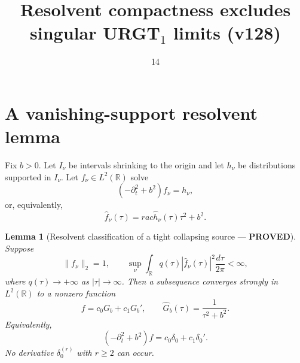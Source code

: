 \documentclass[11pt]{article}
\title{Resolvent compactness excludes singular URGT$_1$ limits (v128)}
\date{14}
\newcommand{\PROVED}{\textcolor{green!40!black}{\textbf{PROVED}}}
\newtheorem{lemma}{Lemma}
\begin{document}
\maketitle

\section{A vanishing-support resolvent lemma}

Fix $b>0$.  Let $I_\nu$ be intervals shrinking to the origin and let
$h_\nu$ be distributions supported in $I_\nu$.  Let $f_\nu\in L^2(\mathbb
R)$ solve
\begin{equation}
 (-\partial_t^2+b^2)f_\nu=h_\nu,                            \tag{1}
\end{equation}
or, equivalently,
\begin{equation}
 \widehat f_\nu(\tau)=rac{\widehat h_\nu(\tau)}
                            {\tau^2+b^2}.                   \tag{2}
\end{equation}

\begin{lemma}[Resolvent classification of a tight collapsing source ---
\PROVED]
Suppose
\begin{equation}
 \|f_\nu\|_2=1,
 \qquad
 \sup_\nu\int_{\mathbb R}q(\tau)|\widehat f_\nu(\tau)|^2
                 \frac{d\tau}{2\pi}<\infty,               \tag{3}
\end{equation}
where $q(\tau)\to+\infty$ as $|\tau|\to\infty$.  Then a subsequence
converges strongly in $L^2(\mathbb R)$ to a nonzero function
\begin{equation}
 f=c_0G_b+c_1G_b',
 \qquad
 \widehat G_b(\tau)=\frac1{\tau^2+b^2}.                    \tag{4}
\end{equation}
Equivalently,
\begin{equation}
 (-\partial_t^2+b^2)f=c_0\delta_0+c_1\delta_0'.            \tag{5}
\end{equation}
No derivative $\delta_0^{(r)}$ with $r\ge2$ can occur.
\end{lemma}
\end{document}
